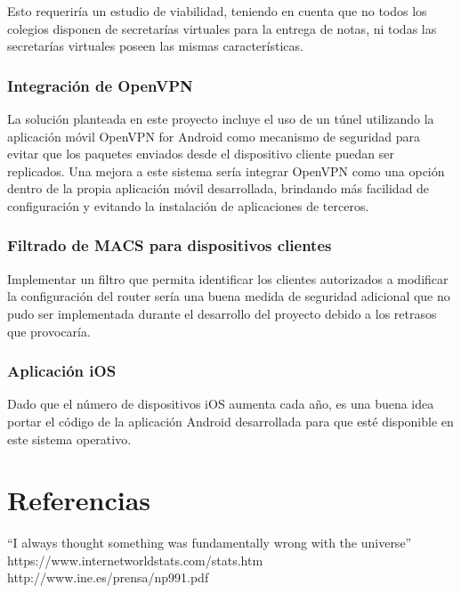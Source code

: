 \documentclass[12pt]{article}
\begin{document}
        Esto requeriría un estudio de viabilidad, teniendo en cuenta que no todos los colegios disponen de secretarías virtuales para la entrega de notas, ni todas las secretarías virtuales poseen las mismas características.

        \subsubsection{Integración de OpenVPN}
        La solución planteada en este proyecto incluye el uso de un túnel utilizando la aplicación móvil OpenVPN for Android como mecanismo de seguridad para evitar que los paquetes enviados desde el dispositivo cliente puedan ser replicados. Una mejora a este sistema sería integrar OpenVPN como una opción dentro de la propia aplicación móvil desarrollada, brindando más facilidad de configuración y evitando la instalación de aplicaciones de terceros.

        \subsubsection{Filtrado de MACS para dispositivos clientes}
        Implementar un filtro que permita identificar los clientes autorizados a modificar la configuración del router sería una buena medida de seguridad adicional que no pudo ser implementada durante el desarrollo del proyecto debido a los retrasos que provocaría.

        \subsubsection{Aplicación iOS}
        Dado que el número de dispositivos iOS aumenta cada año, es una buena idea portar el código de la aplicación Android desarrollada para que esté disponible en este sistema operativo.

\section{Referencias} \label{sec:ref}
``I always thought something was fundamentally wrong with the universe'' \citep{adams1995hitchhiker}
https://www.internetworldstats.com/stats.htm \citep{hola}
http://www.ine.es/prensa/np991.pdf \citep{Menores que utilizan internet}
\end{document}
